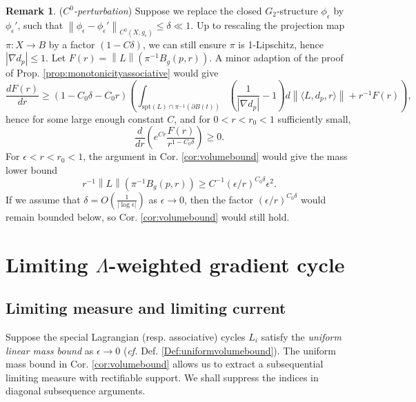 \documentclass{article}
\theoremstyle{definition}
\newtheorem{rmk}{Remark}
\newcommand{\cf}{\emph{cf.} }
\newcommand{\norm}[1]{\left\lVert#1\right\rVert}
\begin{document}
				
				
				
				
				
				
				
	\begin{rmk}\label{rmk:logconvergencerate}(\emph{$C^0$-perturbation})
	Suppose we replace the closed $G_2$-structure $\phi_\epsilon$ by $\phi_\epsilon'$, such that 
	$\norm{ \phi_\epsilon - \phi_\epsilon'}_{C^0(X, g_\epsilon)} \leq \delta\ll 1$. Up to rescaling the projection map $\pi: X\to B$ by a factor $(1-C\delta)$, we can still ensure $\pi$ is 1-Lipschitz, hence $|\nabla d_p|\leq 1$.
	Let $F(r)= \norm{L}(\pi^{-1} B_g(p,r))$.  A minor adaption of the proof of Prop. \ref{prop:monotonicityassociative} would give
	\[
	\frac{d F(r)}{dr} \geq  (1-C_0 \delta- C_0 r)   \left(     \int_{  \text{spt}(L) \cap \pi^{-1}(\partial B(t))  } ( \frac{1}{|\nabla d_p| } -1) d\norm{ \langle L, d_p, r\rangle} + r^{-1}  F(r)  \right),
	\]
	hence for some large enough constant $C$, and for $0<r<r_0<1$ sufficiently small,
	\[
	\frac{d}{dr} ( e^{Cr}  \frac{F(r) }{ r^{1-C_0 \delta} }     ) \geq 0.
	\]
	For $\epsilon< r< r_0<1$, the argument in Cor. \ref{cor:volumebound} would give the mass lower bound
	\[
	r^{-1 }    \norm{L}(\pi^{-1} B_g(p,r)) \geq C^{-1}  (\epsilon/r)^{  C_0\delta } \epsilon^2.
	\]
	If we assume that $\delta= O(  \frac{1}{|\log \epsilon|}    )$ as $\epsilon\to 0$, then the factor $ (\epsilon/r)^{  C_0\delta }$ would remain bounded below, so Cor. \ref{cor:volumebound} would still hold.
	\end{rmk}
				
				
				
				
								

				

				
				

				
				
				
				
\section{Limiting $\Lambda$-weighted gradient cycle}\label{sect:limitgradientcycle}
				
	
								
				\subsection{Limiting measure and limiting current}
				
				
					Suppose  the special Lagrangian (resp. associative) cycles $L_i$ satisfy the \emph{uniform linear mass bound} as $\epsilon\to 0$ (\cf Def. \ref{Def:uniformvolumebound}). 
				The uniform mass bound in Cor. \ref{cor:volumebound} allows us to extract a subsequential limiting measure with rectifiable support. We shall suppress the indices in diagonal subsequence arguments.
				
\end{document}
